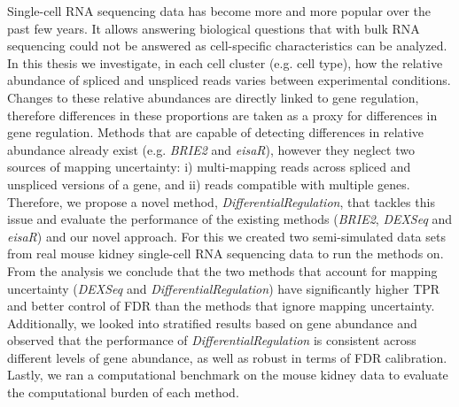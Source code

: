 \documentclass[11pt,a4paper,oneside]{book}
\begin{document}
Single-cell RNA sequencing data has become more and more popular over the past few years. It allows answering biological questions that with bulk RNA sequencing could not be answered as cell-specific characteristics can be analyzed. In this thesis we investigate, in each cell cluster (e.g. cell type), how the relative abundance of spliced and unspliced reads varies between experimental conditions. Changes to these relative abundances are directly linked to gene regulation, therefore differences in these proportions are taken as a proxy for differences in gene regulation. Methods that are capable of detecting differences in relative abundance already exist (e.g. \emph{BRIE2} and \emph{eisaR}), however they neglect two sources of mapping uncertainty: i) multi-mapping reads across spliced and unspliced versions of a gene, and ii) reads compatible with multiple genes. Therefore, we propose a novel method, \emph{DifferentialRegulation},  that tackles this issue and evaluate the performance of the existing methods (\emph{BRIE2}, \emph{DEXSeq} and \emph{eisaR}) and our novel approach. For this we created two semi-simulated data sets from real mouse kidney single-cell RNA sequencing data to run the methods on. From the analysis we conclude that the two methods that account for mapping uncertainty (\emph{DEXSeq} and \emph{DifferentialRegulation}) have significantly higher TPR and better control of FDR than the methods that ignore mapping uncertainty. Additionally, we looked into stratified results based on gene abundance and observed that the performance of \emph{DifferentialRegulation} is consistent across different levels of gene abundance, as well as robust in terms of FDR calibration. Lastly, we ran a computational benchmark on the mouse kidney data to evaluate the computational burden of each method.


















\cleardoublepage
\end{document}
